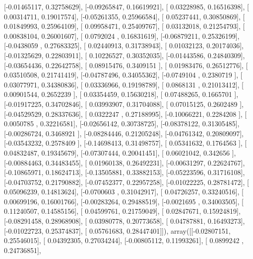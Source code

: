 \documentclass{article}
\begin{document}
       [-0.01465117,  0.32758629],
       [-0.09265847,  0.16619921],
       [ 0.03228985,  0.16516398],
       [ 0.00314711,  0.19017574],
       [-0.05261355,  0.25966584],
       [ 0.05237441,  0.30850869],
       [ 0.01849993,  0.25964109],
       [ 0.09958471,  0.25409767],
       [ 0.03132018,  0.21254793],
       [ 0.00838104,  0.26001607],
       [ 0.0792024 ,  0.16831619],
       [-0.06879211,  0.25326199],
       [-0.0438059 ,  0.27683325],
       [ 0.02440913,  0.31738943],
       [ 0.01032123,  0.20174036],
       [-0.01325629,  0.22803911],
       [ 0.10226527,  0.30352035],
       [-0.01443586,  0.24840309],
       [-0.03654436,  0.22642758],
       [ 0.08915476,  0.3409151 ],
       [ 0.01983476,  0.26512776],
       [ 0.03510508,  0.21741419],
       [-0.04787496,  0.34055362],
       [-0.0749104 ,  0.2380719 ],
       [ 0.03077971,  0.34380836],
       [ 0.03336966,  0.19198789],
       [ 0.0868131 ,  0.21013412],
       [ 0.00901544,  0.2652239 ],
       [ 0.03354459,  0.15630218],
       [ 0.07488265,  0.1665701 ],
       [-0.01917225,  0.34702846],
       [ 0.03993907,  0.31704088],
       [ 0.07015125,  0.2602489 ],
       [-0.04529529,  0.28337636],
       [ 0.0322247 ,  0.27188995],
       [-0.10066221,  0.2284208 ],
       [ 0.0050785 ,  0.32216581],
       [-0.02656142,  0.30738725],
       [-0.08378122,  0.31305485],
       [-0.00286724,  0.3468921 ],
       [-0.08284446,  0.21205248],
       [-0.04761342,  0.20809097],
       [-0.03543232,  0.2578409 ],
       [-0.14698413,  0.31498757],
       [ 0.05341632,  0.1764563 ],
       [ 0.04832487,  0.19345679],
       [-0.07307444,  0.20041451],
       [ 0.06021042,  0.342656  ],
       [-0.00884463,  0.34483455],
       [ 0.01960138,  0.26492231],
       [-0.00631297,  0.22624767],
       [-0.10865971,  0.18624713],
       [-0.13505881,  0.33882153],
       [-0.05223596,  0.31716108],
       [-0.04703752,  0.21790882],
       [-0.07452377,  0.22957258],
       [-0.01022225,  0.28781472],
       [ 0.05096239,  0.14813624],
       [-0.0700603 ,  0.31042917],
       [ 0.04726257,  0.33240516],
       [ 0.00699196,  0.16001766],
       [-0.00283264,  0.29488519],
       [-0.0021695 ,  0.34003505],
       [ 0.11240507,  0.14585156],
       [ 0.04599761,  0.21759049],
       [ 0.02847671,  0.15924819],
       [-0.08291458,  0.28968908],
       [ 0.03980778,  0.20773658],
       [ 0.04787881,  0.16493273],
       [-0.01022723,  0.25374837],
       [ 0.05761683,  0.28447401]]), array([[-0.02807151,  0.25546015],
       [ 0.04392305,  0.27034244],
       [-0.00805112,  0.11993261],
       [ 0.0899242 ,  0.24736851],
\end{document}
